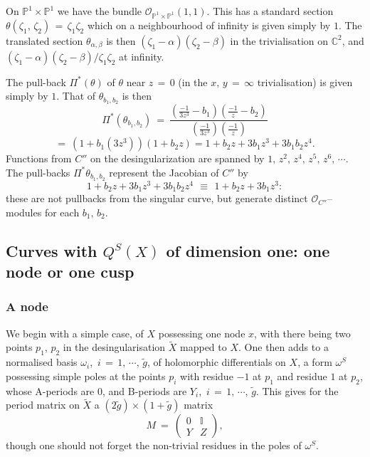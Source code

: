 \documentclass[12pt,reqno]{amsart}
\numberwithin{equation}{section}
\theoremstyle{definition}
\theoremstyle{remark}
\def\bC{{\mathbb {C}}}
\def\bP{{\mathbb {P}}}
\def\bI{{\mathbb {I}}}
\def\pO{{\mathcal O}}
\begin{document}
On $\bP^1\times\bP^1$ we have the bundle ${\pO}_{\bP^1\times\bP^1}(1, 1)$. This has a standard section
$\theta(\zeta_1,\, \zeta_2)\,=\, \zeta_1\zeta_2$ which on a neighbourhood of infinity is given simply
by $1$. The translated section $\theta_{\alpha, \beta}$ is then  
$(\zeta_1-\alpha)(\zeta_2-\beta)$ in the trivialisation on $\bC^2$, and $(\zeta_1-\alpha)(\zeta_2-\beta)/\zeta_1\zeta_2$ at infinity.

The pull-back $\Pi^*(\theta)$ of $\theta$ near $z\,=\,0$ (in the $x,\,y\,=\,\infty$ trivialisation) is given simply by $1$. That of $\theta_{b_1, b_2}$ is then 
$$\Pi^*(\theta_{b_1, b_2})\ =\ \frac {(\frac {-1}{3z^3}-b_1)( \frac{-1}{z}-b_2)}{(\frac {-1}{3z^3})(
\frac{-1}{z})}
$$
$$
=\ (1+b_1 (3z^3))(1+b_2 z) = 1+ b_2 z + 3b_1 z^3 + 3b_1 b_2z^4.$$
Functions from $C''$ on the desingularization are spanned by $1,\, z^2,\, z^4,\, z^5,\, z^6,\,\cdots$. The
pull-backs  $\Pi^* \theta_{b_1, b_2}$ represent 
the Jacobian of $C''$ by $$1+ b_2z + 3b_1 z^3 + 3b_1 b_2z^4\,\ \equiv\,\ 1+  b_2 z + 3b_1 z^3:$$ these are
not pullbacks from the singular curve, but generate distinct $\pO_{C''}$--modules for each $b_1,\,b_2$. 

\subsection{Curves with $Q^S(X)$ of dimension one: one node or one cusp}

\subsubsection{A node} We begin with a simple case, of $X$ possessing one node $x$, with there being
two points $p_1,\, p_2$ in the desingularisation $\widetilde X$ mapped to $X$. One then adds to a
normalised basis $\omega_i$,\, $i\,=\,1,\,\cdots ,\, \widetilde g$, of holomorphic differentials on $X$,
a form $\omega^S$ possessing simple poles at the points $p_i$ with residue $-1$ at $p_1$
and residue $ 1$ at $p_2$, whose A-periods are $0$, and B-periods are $Y_i$,\, $i\,=\, 1,\,
\cdots,\,\widetilde{g}$. This gives for the period matrix on $\widetilde X$ a $(2 \widetilde{g})\times
(1+  \widetilde{g})$ matrix 
\begin{equation}\label{em}
M\ =\ \begin{pmatrix}   0 &   \bI\\Y& Z\end{pmatrix},
\end{equation}
though one should not forget the non-trivial residues in the poles of $\omega^S$.
\end{document}
